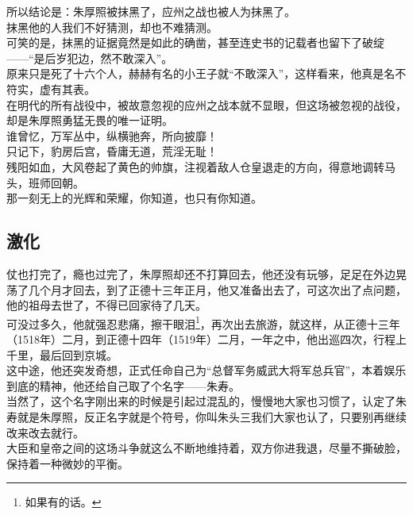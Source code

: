 \begin{multicols}{\theparacolNo}
所以结论是：朱厚照被抹黑了，应州之战也被人为抹黑了。\\

抹黑他的人我们不好猜测，却也不难猜测。\\

可笑的是，抹黑的证据竟然是如此的确凿，甚至连史书的记载者也留下了破绽——“是后岁犯边，然不敢深入”。\\

原来只是死了十六个人，赫赫有名的小王子就“不敢深入”，这样看来，他真是名不符实，虚有其表。\\

在明代的所有战役中，被故意忽视的应州之战本就不显眼，但这场被忽视的战役，却是朱厚照勇猛无畏的唯一证明。\\

谁曾忆，万军丛中，纵横驰奔，所向披靡！\\

只记下，豹房后宫，昏庸无道，荒淫无耻！\\

残阳如血，大风卷起了黄色的帅旗，注视着敌人仓皇退走的方向，得意地调转马头，班师回朝。\\

那一刻无上的光辉和荣耀，你知道，也只有你知道。\\

\subsection{激化}
仗也打完了，瘾也过完了，朱厚照却还不打算回去，他还没有玩够，足足在外边晃荡了几个月才回去，到了正德十三年正月，他又准备出去了，可这次出了点问题，他的祖母去世了，不得已回家待了几天。\\

可没过多久，他就强忍悲痛，擦干眼泪\footnote{如果有的话。}，再次出去旅游，就这样，从正德十三年（1518年）二月，到正德十四年（1519年）二月，一年之中，他出巡四次，行程上千里，最后回到京城。\\

这中途，他还突发奇想，正式任命自己为“总督军务威武大将军总兵官”，本着娱乐到底的精神，他还给自己取了个名字——朱寿。\\

当然了，这个名字刚出来的时候是引起过混乱的，慢慢地大家也习惯了，认定了朱寿就是朱厚照，反正名字就是个符号，你叫朱头三我们大家也认了，只要别再继续改来改去就行。\\

大臣和皇帝之间的这场斗争就这么不断地维持着，双方你进我退，尽量不撕破脸，保持着一种微妙的平衡。\\


\end{multicols}
